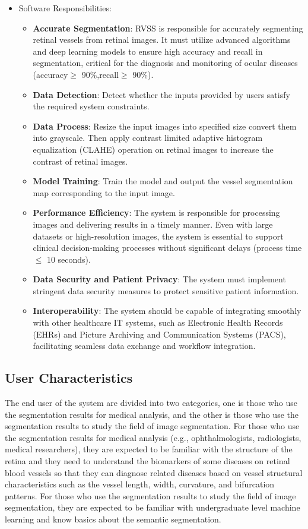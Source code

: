 \documentclass[12pt]{article}
\begin{document}
\begin{itemize}
\item Software Responsibilities:
\begin{itemize}
\item \textbf{Accurate Segmentation}: RVSS is responsible for accurately segmenting retinal vessels from retinal images. It must utilize advanced algorithms and deep learning models to ensure high accuracy and recall in segmentation, critical for the diagnosis and monitoring of ocular diseases (accuracy$\geq$ 90$\%$,recall$\geq$ 90$\%$). 
\item \textbf{Data Detection}: Detect whether the inputs provided by users satisfy the required system constraints.
\item \textbf{Data Process}: Resize the input images into specified size convert them into grayscale. Then apply contrast limited adaptive histogram equalization (CLAHE) operation on retinal images to increase the contrast of retinal images.
\item \textbf{Model Training}: Train the model and output the vessel segmentation map corresponding to the input image.
\item \textbf{Performance Efficiency}: The system is responsible for processing images and delivering results in a timely manner. Even with large datasets or high-resolution images, the system is essential to support clinical decision-making processes without significant delays (process time $\leq$ 10 seconds).
\item \textbf{Data Security and Patient Privacy}: The system must implement stringent data security measures to protect sensitive patient information. 
\item \textbf{Interoperability}: The system should be capable of integrating smoothly with other healthcare IT systems, such as Electronic Health Records (EHRs) and Picture Archiving and Communication Systems (PACS), facilitating seamless data exchange and workflow integration.
\end{itemize}
\end{itemize}
\subsection{User Characteristics} \label{SecUserCharacteristics}

The end user of the system are divided into two categories, one is those who use the segmentation results for medical analysis, and the other is those who use the segmentation results to study the field of image segmentation. For those who use the segmentation results for medical analysis (e.g., ophthalmologists, radiologists, medical researchers), they are expected to  be familiar with the structure of the retina and they need to understand the biomarkers of some diseases on retinal blood vessels so that they can diagnose related diseases based on vessel structural characteristics such as the vessel length, width, curvature, and bifurcation patterns. For those who use the segmentation results to study the field of image segmentation, they are expected to be familiar with undergraduate level machine learning and know basics about the semantic segmentation. 
\end{document}
